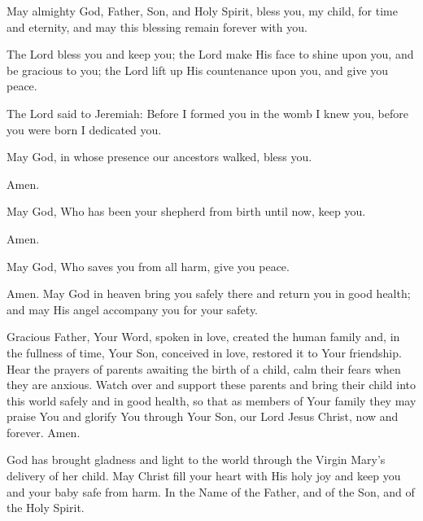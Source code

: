 
\label{prayer:blessing_child}
May almighty God, Father, Son, and Holy Spirit, bless you, my child, for time and eternity, and may this blessing remain forever with you.

\label{prayer:blessing_patriarchs}
The Lord bless you and keep you;
the Lord make His face to shine upon you, and be gracious to you;
the Lord lift up His countenance upon you, and give you peace.

\label{prayer:blessing_child_birthday}
The Lord said to Jeremiah:
Before I formed you in the womb I knew you, before you were born I dedicated you.

May God, in whose presence our ancestors walked, bless you.

\response Amen.

May God, Who has been your shepherd from birth until now, keep you.

\response Amen.

May God, Who saves you from all harm, give you peace.

\response Amen.
\newpage
{}
\label{prayer:travel_blessing}
May God in heaven bring you safely there and return you in good health;
and may His angel accompany you for your safety.

\label{prayer:parents_before_birth_of_child}
Gracious Father, Your Word, spoken in love, created the human family and, in the fullness of time, Your Son, conceived in love, restored it to Your friendship.
Hear the prayers of parents awaiting the birth of a child, calm their fears when they are anxious.
Watch over and support these parents and bring their child into this world safely and in good health, so that as members of Your family they may praise You and glorify You through Your Son, our Lord Jesus Christ, now and forever.
Amen.

\label{prayer:mother_before_childbirth}
God has brought gladness and light to the world through the Virgin Mary's delivery of her child.
May Christ fill your heart with His holy joy and keep you and your baby safe from harm. 
In the Name of the Father, and of the Son, and of the Holy Spirit.

\newpage